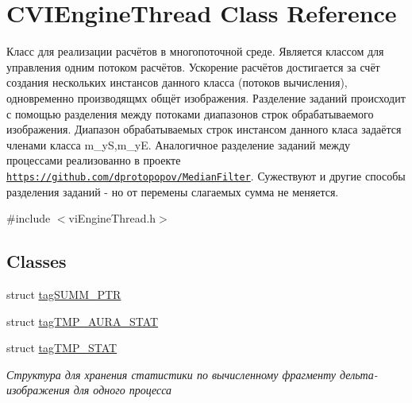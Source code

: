 \hypertarget{class_c_v_i_engine_thread}{\section{C\+V\+I\+Engine\+Thread Class Reference}
\label{class_c_v_i_engine_thread}
}


Класс для реализации расчётов в многопоточной среде. Является классом для управления одним потоком расчётов. Ускорение расчётов достигается за счёт создания нескольких инстансов данного класса (потоков вычисления), одновременно производящмх общёт изображения. Разделение заданий происходит с помощью разделения между потоками диапазонов строк обрабатываемого изображения. Диапазон обрабатываемых строк инстансом данного класа задаётся членами класса m\+\_\+y\+S,m\+\_\+y\+E. Аналогичное разделение заданий между процессами реализованно в проекте \href{https://github.com/dprotopopov/MedianFilter}{\tt https\+://github.\+com/dprotopopov/\+Median\+Filter}. Сужествуют и другие способы разделения заданий -\/ но от перемены слагаемых сумма не меняется.  




{\ttfamily \#include $<$vi\+Engine\+Thread.\+h$>$}

\subsection*{Classes}
\begin{DoxyCompactItemize}
\item 
struct \hyperlink{struct_c_v_i_engine_thread_1_1tag_s_u_m_m___p_t_r}{tag\+S\+U\+M\+M\+\_\+\+P\+T\+R}
\item 
struct \hyperlink{struct_c_v_i_engine_thread_1_1tag_t_m_p___a_u_r_a___s_t_a_t}{tag\+T\+M\+P\+\_\+\+A\+U\+R\+A\+\_\+\+S\+T\+A\+T}
\item 
struct \hyperlink{struct_c_v_i_engine_thread_1_1tag_t_m_p___s_t_a_t}{tag\+T\+M\+P\+\_\+\+S\+T\+A\+T}
\begin{DoxyCompactList}\small\item\em Структура для хранения статистики по вычисленному фрагменту дельта-\/изображения для одного процесса \end{DoxyCompactList}\end{DoxyCompactItemize}
